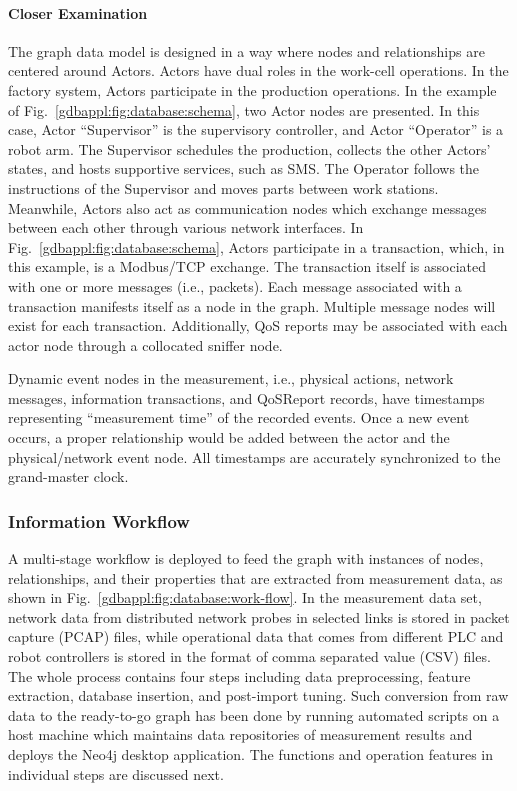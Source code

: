 \paragraph{Closer Examination}
The graph data model is designed in a way where nodes and relationships are centered around Actors. Actors have dual roles in the work-cell operations. In the factory system, Actors participate in the production operations.
In the example of Fig.~\ref{gdbappl:fig:database:schema}, two Actor nodes are presented. In this case, Actor ``Supervisor'' is the supervisory controller, and Actor ``Operator'' is a robot arm. The Supervisor schedules the production, collects the other Actors' states, and hosts supportive services, such as SMS. The Operator follows the instructions of the Supervisor and moves parts between work stations. Meanwhile, Actors also act as communication nodes which exchange messages between each other through various network interfaces. In Fig.~\ref{gdbappl:fig:database:schema}, Actors participate in a transaction, which, in this example, is a Modbus/TCP exchange. The transaction itself is associated with one or more messages (i.e., packets). Each message associated with a transaction manifests itself as a node in the graph. Multiple message nodes will exist for each transaction. Additionally, QoS reports may be associated with each actor node through a collocated sniffer node.  %

Dynamic event nodes in the measurement, i.e., physical actions, network messages, information transactions, and QoSReport records, have timestamps representing ``measurement time'' of the recorded events. Once a new event occurs, a proper relationship would be added between the actor and the physical/network event node. All timestamps are accurately synchronized to the grand-master clock.


\subsubsection{Information Workflow}

A multi-stage workflow is deployed to feed the graph with instances of nodes, relationships, and their properties that are extracted from measurement data, as shown in Fig.~\ref{gdbappl:fig:database:work-flow}. In the measurement data set, network data from distributed network probes in selected links is stored in packet capture (PCAP) files, while operational data that comes from different PLC and robot controllers is stored in the format of comma separated value (CSV) files. The whole process contains four steps including data preprocessing, feature extraction, database insertion, and post-import tuning. Such conversion from raw data to the ready-to-go graph has been done  by running automated scripts on a host machine which maintains data repositories of measurement results and deploys the Neo4j desktop application. The functions and operation features in individual steps are discussed next. 


